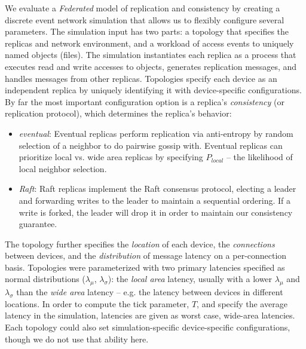 \documentclass[10pt,conference,letterpaper]{IEEEtran}
\begin{document}

We evaluate a \emph{Federated} model of replication and consistency by creating a
discrete event network simulation that allows us to flexibly configure several parameters.
The simulation input has two parts: a topology that specifies the replicas and
network environment, and a workload of access events to uniquely named objects
(files).
The simulation instantiates each replica as a process that executes read and
write accesses to objects, generates replication messages, and
handles messages from other replicas.
Topologies specify each device as an independent replica by uniquely identifying it
with device-specific configurations.
By far the most important configuration option is a replica's \textit{consistency} (or replication
protocol), which determines the replica's behavior:
\begin{itemize}
    \item \emph{eventual}: Eventual replicas perform replication via anti-entropy by random
      selection of a neighbor to do pairwise gossip with. Eventual  replicas can prioritize
      local vs. wide area replicas by specifying $P_{local}$ -- the likelihood of local neighbor selection.
    \item \emph{Raft}: Raft replicas implement the Raft consensus protocol, electing a
      leader and forwarding writes to the leader to maintain a sequential  ordering. If a
      write is forked, the leader will drop it in order to maintain our consistency
      guarantee.
\end{itemize}

The topology further specifies the \textit{location} of each device, the
\textit{connections} between devices, and the \textit{distribution} of message latency on
a per-connection basis.
Topologies were parameterized with two primary latencies specified as normal distributions ($\lambda_{\mu}$,
$\lambda_{\sigma}$): the \textit{local area} latency, usually with a lower $\lambda_{\mu}$
and $\lambda_{\sigma}$ than the \textit{wide area} latency -- e.g.
the latency between devices in different locations.
In order to compute the tick parameter, $T$, and specify the average latency in the
simulation, latencies are given as worst case, wide-area latencies.
Each topology could also set simulation-specific device-specific configurations, though we
do not use that ability here.
\end{document}

